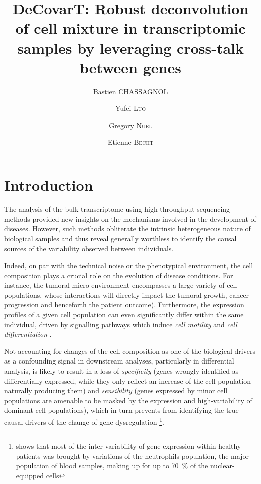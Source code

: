 \documentclass[long, final]{jobim}
\title{DeCovarT: Robust deconvolution of cell mixture in transcriptomic samples by leveraging cross-talk between genes}
\author{Bastien \textsc{CHASSAGNOL}\inst{1, 2}  \and Yufei \textsc{Luo}\inst{1} \and Gregory \textsc{Nuel}\inst{2} \and Etienne \textsc{Becht}\inst{1}}
\institute{
 Les Laboratoires Servier, 50 Rue Carnot, 92150, Suresnes, France
 \and
 LPSM (Laboratoire de Probabilités, Statistiques et Modélisation),  4 place Jussieu, 75005, Paris, France
}
\begin{document}

\maketitle

 \section{Introduction}
 \label{sec:introduction}

The analysis of the bulk transcriptome using high-throughput sequencing methods provided new insights on the mechanisms involved in the development of diseases. However, such methods obliterate the intrinsic heterogeneous nature of biological samples and thus reveal generally worthless to identify the causal sources of the variability observed between individuals. 

Indeed, on par with the technical noise or the phenotypical environment, the cell composition plays a crucial role on the evolution of disease conditions. For instance, the tumoral micro environment encompasses a large variety of cell populations, whose interactions will directly impact the tumoral growth, cancer progression and henceforth the patient outcome). Furthermore, the expression profiles of a given cell population can even significantly differ within the same individual, driven by signalling pathways which induce \textit{cell motility} and \textit{cell differentiation} \cite{shoemaker_etal12}. 

Not accounting for changes of the cell composition as one of the biological drivers as a confounding signal in downstream analyses, particularly in differential analysis, is likely to result in a loss of \textit{specificity} (genes wrongly identified as differentially expressed, while they only reflect an increase of the cell population naturally producing them) and \textit{sensibility} (genes expressed by minor cell populations are amenable to be masked by the expression and high-variability of dominant cell populations), which in turn prevents from identifying the true causal drivers of the change of gene dysregulation \footnote{\cite{whitney_etal03} shows that most of the inter-variability of gene expression within healthy patients was brought by variations of the neutrophils population, the major population of blood samples, making up for up to \qty{70}{\percent} of the nuclear-equipped cells}.
\end{document}
